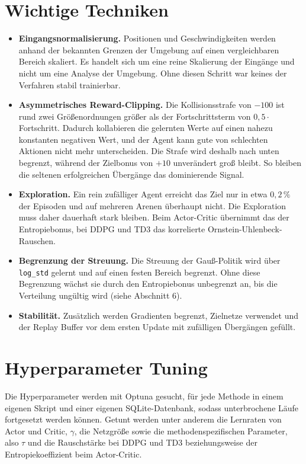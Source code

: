 \documentclass[11pt,a4paper]{article}
\begin{document}
\section{Wichtige Techniken}
\begin{itemize}\setlength\itemsep{3pt}
  \item \textbf{Eingangsnormalisierung.} Positionen und Geschwindigkeiten werden anhand der
        bekannten Grenzen der Umgebung auf einen vergleichbaren Bereich skaliert. Es handelt
        sich um eine reine Skalierung der Eingänge und nicht um eine Analyse der Umgebung. Ohne
        diesen Schritt war keines der Verfahren stabil trainierbar.
  \item \textbf{Asymmetrisches Reward-Clipping.} Die Kollisionsstrafe von $-100$ ist rund zwei
        Größenordnungen größer als der Fortschrittsterm von $0{,}5 \cdot$ Fortschritt. Dadurch
        kollabieren die gelernten Werte auf einen nahezu konstanten negativen Wert, und der
        Agent kann gute von schlechten Aktionen nicht mehr unterscheiden. Die Strafe wird
        deshalb nach unten begrenzt, während der Zielbonus von $+10$ unverändert groß bleibt.
        So bleiben die seltenen erfolgreichen Übergänge das dominierende Signal.
  \item \textbf{Exploration.} Ein rein zufälliger Agent erreicht das Ziel nur in etwa
        $0{,}2\,\%$ der Episoden und auf mehreren Arenen überhaupt nicht. Die Exploration muss
        daher dauerhaft stark bleiben. Beim Actor-Critic übernimmt das der
        Entropiebonus, bei DDPG und TD3 das korrelierte Ornstein-Uhlenbeck-Rauschen.
  \item \textbf{Begrenzung der Streuung.} Die Streuung der Gauß-Politik wird über
        \texttt{log\_std} gelernt und auf einen festen Bereich begrenzt. Ohne diese Begrenzung
        wächst sie durch den Entropiebonus unbegrenzt an, bis die Verteilung ungültig wird
        (siehe Abschnitt 6).
  \item \textbf{Stabilität.} Zusätzlich werden Gradienten begrenzt, Zielnetze verwendet und der
        Replay Buffer vor dem ersten Update mit zufälligen Übergängen gefüllt.
\end{itemize}

\section{Hyperparameter Tuning}
Die Hyperparameter werden mit Optuna gesucht, für jede Methode in einem eigenen Skript und
einer eigenen SQLite-Datenbank, sodass unterbrochene Läufe fortgesetzt werden können. Getunt
werden unter anderem die Lernraten von Actor und Critic, $\gamma$, die Netzgröße sowie die
methodenspezifischen Parameter, also $\tau$ und die Rauschstärke bei DDPG und TD3
beziehungsweise der Entropiekoeffizient beim Actor-Critic.
\end{document}
